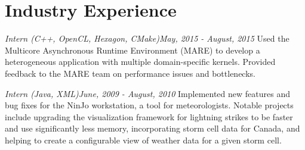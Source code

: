 \section{\sc Industry Experience}

{\em Intern (C++, OpenCL, Hexagon, CMake)}{\em May, 2015 - August, 2015}
{
  Used the Multicore Asynchronous Runtime Environment (MARE) to develop a heterogeneous application with multiple domain-specific kernels.
  Provided feedback to the MARE team on performance issues and bottlenecks.
}

{\em Intern (Java, XML)}{\em June, 2009 - August, 2010}
{
  Implemented new features and bug fixes for the NinJo workstation, a tool for meteorologists.
  Notable projects include upgrading the visualization framework for lightning strikes to be faster and use significantly less memory, incorporating storm cell data for Canada, and helping to create a configurable view of weather data for a given storm cell.
}
